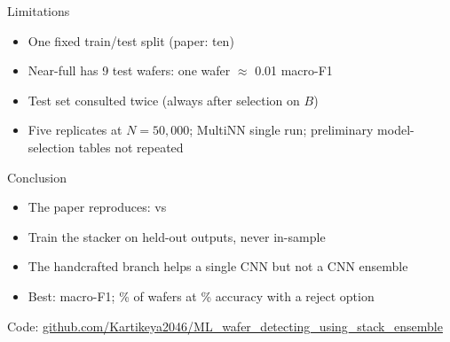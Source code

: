 \documentclass[aspectratio=169,10pt]{beamer}
\begin{document}
\begin{frame}{Limitations}
\begin{itemize}
\item One fixed train/test split (paper: ten)
\item Near-full has 9 test wafers: one wafer $\approx$ 0.01 macro-F1
\item Test set consulted twice (always after selection on $B$)
\item Five replicates at $N=50{,}000$; MultiNN single run; preliminary model-selection tables not repeated
\end{itemize}
\end{frame}

\begin{frame}{Conclusion}
\begin{itemize}
\item The paper \alert{reproduces}: \ReproMLR{} vs \PaperMLR
\item Train the stacker on held-out outputs, never in-sample
\item The handcrafted branch helps a single CNN but not a CNN ensemble
\item Best: \alert{\FinalMacro} macro-F1; \RejCov\% of wafers at \RejAcc\% accuracy with a reject option
\end{itemize}
\vspace{1em}
\small Code: \url{github.com/Kartikeya2046/ML_wafer_detecting_using_stack_ensemble}
\end{frame}
\end{document}

